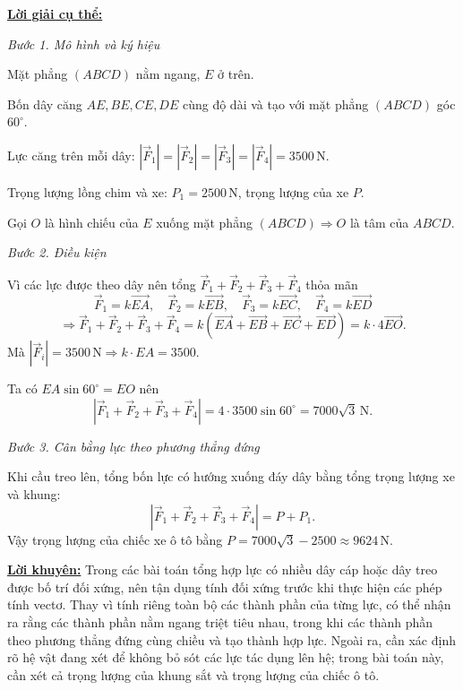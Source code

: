 \documentclass[12pt,a4paper,oneside]{book}
\theoremstyle{theorem}
\theoremstyle{definition}
\begin{document}
        \noindent \underline{\textbf{Lời giải cụ thể:}}

            \noindent \textit{Bước 1. Mô hình và ký hiệu}
            
            Mặt phẳng $(ABCD)$ nằm ngang, $E$ ở trên.
            
            Bốn dây căng $AE,BE,CE,DE$ cùng độ dài và tạo với mặt phẳng $(ABCD)$ góc $60^\circ$.
            
            Lực căng trên mỗi dây:
            $|\vec{F}_1|=|\vec{F}_2|=|\vec{F}_3|=|\vec{F}_4|=3500\,\mathrm{N}$.
            
            Trọng lượng lồng chim và xe: $P_1=2500\,\mathrm{N}$, trọng lượng của xe $P$.
            
            Gọi $O$ là hình chiếu của $E$ xuống mặt phẳng $(ABCD)\Rightarrow O$ là tâm của $ABCD$.
            
    \noindent \textit{Bước 2. Điều kiện}
            
            Vì các lực được theo dây nên tổng $\vec{F}_1+\vec{F}_2+\vec{F}_3+\vec{F}_4$ thỏa mãn
            $$
            \vec{F}_1=k\vec{EA},\quad
            \vec{F}_2=k\vec{EB},\quad
            \vec{F}_3=k\vec{EC},\quad
            \vec{F}_4=k\vec{ED}
            $$
            $$
            \Rightarrow
            \vec{F}_1+\vec{F}_2+\vec{F}_3+\vec{F}_4
            =k(\vec{EA}+\vec{EB}+\vec{EC}+\vec{ED})
            =k\cdot4\vec{EO}.
            $$
            Mà $|\vec{F}_i|=3500\,\mathrm{N}\Rightarrow k\cdot EA=3500$.
            
            Ta có $EA\sin60^\circ=EO$ nên
            $$
            |\vec{F}_1+\vec{F}_2+\vec{F}_3+\vec{F}_4|
            =4\cdot3500\sin60^\circ
            =7000\sqrt{3}\,\mathrm{N}.
            $$
            
        \noindent \textit{Bước 3. Cân bằng lực theo phương thẳng đứng}
            
            Khi cầu treo lên, tổng bốn lực có hướng xuống đáy dây bằng tổng trọng lượng xe và khung:
            $$
            |\vec{F}_1+\vec{F}_2+\vec{F}_3+\vec{F}_4|
            =P+P_1.
            $$
            Vậy trọng lượng của chiếc xe ô tô bằng
            $ P=7000\sqrt{3}-2500\approx9624\,\mathrm{N}.$

        \noindent \underline{\textbf{Lời khuyên:}} Trong các bài toán tổng hợp lực có nhiều dây cáp hoặc dây treo được bố trí đối xứng, nên tận dụng tính đối xứng trước khi thực hiện các phép tính vectơ. Thay vì tính riêng toàn bộ các thành phần của từng lực, có thể nhận ra rằng các thành phần nằm ngang triệt tiêu nhau, trong khi các thành phần theo phương thẳng đứng cùng chiều và tạo thành hợp lực. Ngoài ra, cần xác định rõ hệ vật đang xét để không bỏ sót các lực tác dụng lên hệ; trong bài toán này, cần xét cả trọng lượng của khung sắt và trọng lượng của chiếc ô tô.
              
   
\end{document}
